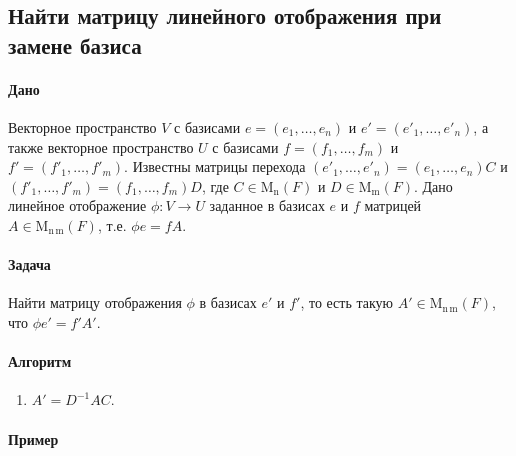 \documentclass{article}
\newcommand{\MatrixDim}[3]{\operatorname{\mathrm{M}_{#2\,#3}}(#1)}
\newcommand{\Matrix}[2]{\operatorname{\mathrm{M}_{#2}}(#1)}
\begin{document}
\subsection{Найти матрицу линейного отображения при замене базиса}

\paragraph{Дано}

Векторное пространство $V$ с базисами $e=(e_1,\ldots,e_n)$ и $e'=(e'_1,\ldots,e'_n)$, а также векторное пространство $U$ с базисами $f = (f_1,\ldots,f_m)$ и $f' = (f'_1,\ldots,f'_m)$.
Известны матрицы перехода $(e'_1,\ldots,e'_n) = (e_1,\ldots,e_n)C$ и $(f'_1,\ldots,f'_m) = (f_1,\ldots,f_m)D$, где $C\in \Matrix{F}{n}$ и $D\in \Matrix{F}{m}$.
Дано линейное отображение $\phi\colon V\to U$ заданное в базисах $e$ и $f$ матрицей $A\in\MatrixDim{F}{n}{m}$, т.е. $\phi e = f A$.

\paragraph{Задача}

Найти матрицу отображения $\phi$ в базисах $e'$ и $f'$, то есть такую $A'\in \MatrixDim{F}{n}{m}$, что $\phi e' = f' A'$.

\paragraph{Алгоритм}

\begin{enumerate}
\item $A' = D^{-1} A C$.
\end{enumerate}

\paragraph{Пример}
\end{document}
